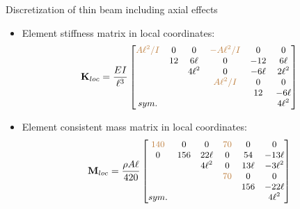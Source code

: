 \documentclass[aspectratio=169]{beamer}
\begin{document}
\begin{frame}{Discretization of thin beam including axial effects}
  \begin{itemize}
    \item Element stiffness matrix in local coordinates:
          $$\small \mathbf{K}_{loc}=\frac{EI}{\ell^3} \begin{bmatrix}
              {\color{brown}A\ell^2/I} & 0  & 0       & {\color{brown}-A\ell^2/I} & 0      & 0       \\
                                       & 12 & 6\ell   & 0                         & -12    & 6\ell   \\
                                       &    & 4\ell^2 & 0                         & -6\ell & 2\ell^2 \\
                                       &    &         & {\color{brown}A\ell^2/I}  & 0      & 0       \\
                                       &    &         &                           & 12     & -6\ell  \\ sym. & & & & & 4\ell^2\end{bmatrix}
          $$
    \item Element consistent mass matrix in local coordinates:
          \[\small  \mathbf{M}_{loc} =\frac{\rho A\ell }{420}\begin{bmatrix}
              {\color{brown}140} & 0   & 0       & {\color{brown}70} & 0      & 0        \\
              0                  & 156 & 22\ell  & 0                 & 54     & -13\ell  \\
                                 &     & 4\ell^2 & 0                 & 13\ell & -3\ell^2 \\
                                 &     &         & {\color{brown}70} & 0      & 0        \\
                                 &     &         &                   & 156    & -22\ell  \\
              sym.               &     &         &                   &        & 4\ell^2  \\
            \end{bmatrix} \]
  \end{itemize}
\end{frame}
\end{document}
